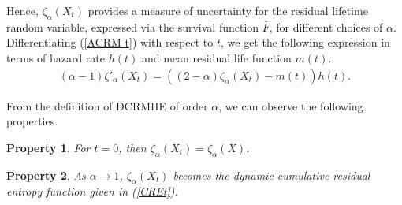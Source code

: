 \documentclass[11pt,reqno]{amsart}
\theoremstyle{tight}
\newtheorem{property}{Property}[section]
\begin{document}
Hence, $\zeta_{\alpha}(X_t)$ provides a measure of uncertainty for the residual lifetime random variable, expressed via the survival function $\bar{F}$, for different choices of $\alpha$.
Differentiating (\ref{ACRM t}) with respect to $t$, we get the following expression in terms of hazard rate $h(t)$ and mean residual life function $m(t)$.
\begin{align}\label{ACRM't}
(\alpha-1) \zeta'_\alpha(X_t)=\left((2-\alpha) \zeta_{\alpha}(X_t)-m(t)\right)h(t).
\end{align}

From the definition of DCRMHE of order $\alpha$, we can observe the following properties.
\begin{property}
For $t=0$, then $\zeta_\alpha(X_t)=\zeta_\alpha(X)$.
\end{property}
\begin{property}
 As $\alpha \to 1$,  $\zeta_\alpha(X_t)$ becomes the dynamic cumulative residual entropy function given in (\ref{CREt}).
 \end{property}
\end{document}
